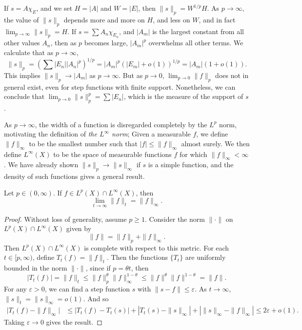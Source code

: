 \begin{example}
  If $s = A \chi_E$, and we set $H = |A|$ and $W = |E|$, then $\| s \|_p = W^{1/p} H$. As $p \to \infty$, the value of $\| s \|_p$ depends more and more on $H$, and less on $W$, and in fact $\lim_{p \to \infty} \| s \|_p = H$. If $s = \sum A_n \chi_{E_n}$, and $|A_m|$ is the largest constant from all other values $A_n$, then as $p$ becomes large, $|A_m|^p$ overwhelms all other terms. We calculate that as $p \to \infty$,
  \[ \| s \|_p = \left( \sum |E_n| |A_n|^p \right)^{1/p} = |A_m|^p (|E_m| + o(1))^{1/p} = |A_m| (1 + o(1)). \]
  This implies $\| s \|_p \to |A_m|$ as $p \to \infty$. But as $p \to 0$, $\lim_{p \to 0} \| f \|_p$ does not in general exist, even for step functions with finite support. Nonetheless, we can conclude that $\lim_{p \to 0} \| s \|_p^p = \sum |E_n|$, which is the measure of the support of $s$.
\end{example}

As $p \to \infty$, the width of a function is disregarded completely by the $L^p$ norm, motivating the definition of \emph{the $L^\infty$ norm}; Given a measurable $f$, we define $\| f \|_\infty$ to be the smallest number such that $|f| \leq \| f \|_\infty$ almost surely. We then define $L^\infty(X)$ to be the space of measurable functions $f$ for which $\| f \|_\infty < \infty$. We have already shown $\| s \|_p \to \| s \|_\infty$ if $s$ is a simple function, and the density of such functions gives a general result.

\begin{theorem}
    Let $p \in (0,\infty)$. If $f \in L^p(X) \cap L^\infty(X)$, then
    \[ \lim_{t \to \infty} \| f \|_t = \| f \|_\infty. \]
\end{theorem}
\begin{proof}
    Without loss of generality, assume $p \geq 1$. Consider the norm $\| \cdot \|$ on $L^p(X) \cap L^\infty(X)$ given by
    \[ \| f \| = \| f \|_p + \| f \|_\infty. \]
    Then $L^p(X) \cap L^\infty(X)$ is complete with respect to this metric. For each $t \in [p,\infty)$, define $T_t(f) = \| f \|_t$. Then the functions $\{ T_t \}$ are uniformly bounded in the norm $\| \cdot \|$, since if $p = \theta t$, then
    \[ |T_t(f)| = \| f \|_t \leq \| f \|_p^\theta \| f \|_\infty^{1-\theta} \leq \| f \|^\theta \| f \|^{1-\theta} = \| f \|. \]
    For any $\varepsilon > 0$, we can find a step function $s$ with $\| s - f \| \leq \varepsilon$. As $t \to \infty$, $\| s \|_t = \| s \|_\infty = o(1)$. And so
    \begin{align*}
        \Big| T_t(f) - \| f \|_\infty \Big| &\leq |T_t(f) - T_t(s)| + |T_t(s) - \| s \|_\infty| + |\| s \|_\infty - \| f \|_\infty| \leq 2\varepsilon + o(1). 
    \end{align*}
    Taking $\varepsilon \to 0$ gives the result.
\end{proof}

